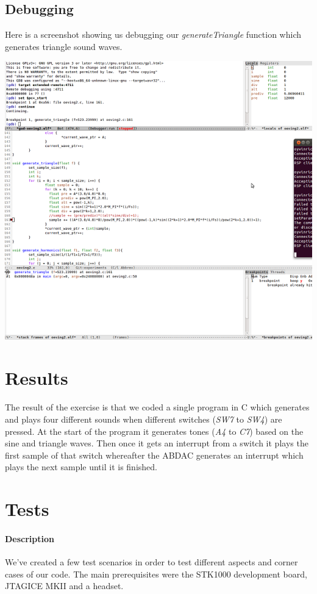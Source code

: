 \documentclass[a4paper,11pt]{article}
\begin{document}
\newpage

\subsection*{Debugging}
Here is a screenshot showing us debugging our \emph{generateTriangle} function which generates triangle sound waves. 
\begin{center}
\includegraphics[scale=1]{images/debugsmall.png}
\end{center}

\section{Results}
The result of the exercise is that we coded a single program in C which generates and plays four different sounds when different switches (\emph{SW7} to \emph{SW4}) are pressed. At the start of the program it generates tones (\emph{A4} to \emph{C7}) based on the sine and triangle waves. Then once it gets an interrupt from a switch it plays the first sample of that switch whereafter the ABDAC generates an interrupt which plays the next sample until it is finished.

\section{Tests}
\paragraph{Description}
We've created a few test scenarios in order to test different aspects and corner cases of our code. The main prerequisites were the STK1000 development board, JTAGICE MKII and a headset.
\end{document}

